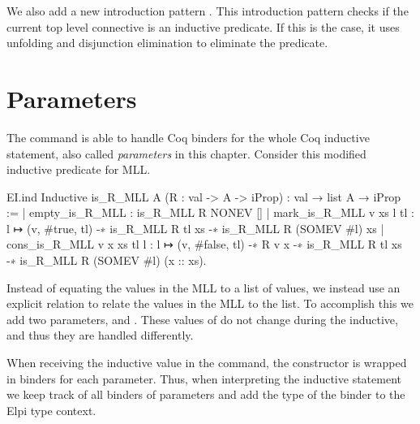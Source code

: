 \documentclass[thesis.tex]{subfiles}
\begin{document}
{We also add a new introduction pattern . This introduction pattern checks if the current top level connective is an inductive predicate. If this is the case, it uses unfolding and disjunction elimination to eliminate the predicate.

\section{Parameters}\label{sec:parameters}
The  command is able to handle Coq binders for the whole Coq inductive statement, also called \emph{parameters} in this chapter. Consider this modified inductive predicate for MLL.
\begin{coqcode}
  EI.ind
  Inductive is_R_MLL {A} (R : val -> A -> iProp) :
                     val → list A → iProp :=
    | empty_is_R_MLL : is_R_MLL R NONEV []
    | mark_is_R_MLL v xs l tl : 
        l ↦ (v, #true, tl) -∗ is_R_MLL R tl xs -∗ 
        is_R_MLL R (SOMEV #l) xs
    | cons_is_R_MLL v x xs tl l : 
        l ↦ (v, #false, tl) -∗ R v x -∗ 
        is_R_MLL R tl xs -∗ 
        is_R_MLL R (SOMEV #l) (x :: xs).
\end{coqcode}
Instead of equating the values in the MLL to a list of values, we instead use an explicit relation to relate the values in the MLL to the list. To accomplish this we add two parameters,  and . These values of  do not change during the inductive, and thus they are handled differently.

When receiving the inductive value in the command, the  constructor is wrapped in binders for each parameter. Thus, when interpreting the inductive statement we keep track of all binders of parameters and add the type of the binder to the Elpi type context.

}
\end{document}
